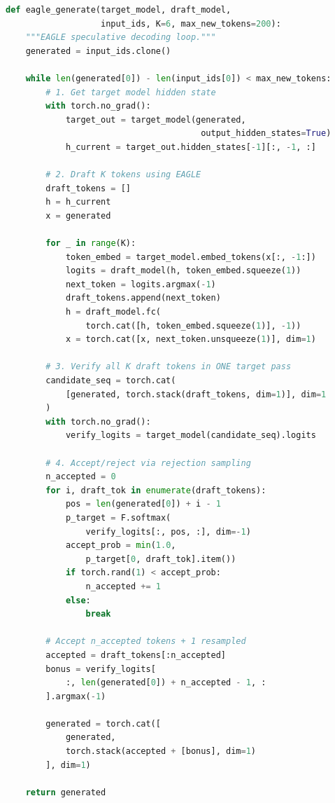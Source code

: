 \documentclass[11pt,a4paper]{article}
\begin{document}
\begin{lstlisting}[language=Python, caption={EAGLE Speculative Decoding Loop}]
def eagle_generate(target_model, draft_model, 
                   input_ids, K=6, max_new_tokens=200):
    """EAGLE speculative decoding loop."""
    generated = input_ids.clone()
    
    while len(generated[0]) - len(input_ids[0]) < max_new_tokens:
        # 1. Get target model hidden state
        with torch.no_grad():
            target_out = target_model(generated, 
                                       output_hidden_states=True)
            h_current = target_out.hidden_states[-1][:, -1, :]
        
        # 2. Draft K tokens using EAGLE
        draft_tokens = []
        h = h_current
        x = generated
        
        for _ in range(K):
            token_embed = target_model.embed_tokens(x[:, -1:])
            logits = draft_model(h, token_embed.squeeze(1))
            next_token = logits.argmax(-1)
            draft_tokens.append(next_token)
            h = draft_model.fc(
                torch.cat([h, token_embed.squeeze(1)], -1))
            x = torch.cat([x, next_token.unsqueeze(1)], dim=1)
        
        # 3. Verify all K draft tokens in ONE target pass
        candidate_seq = torch.cat(
            [generated, torch.stack(draft_tokens, dim=1)], dim=1
        )
        with torch.no_grad():
            verify_logits = target_model(candidate_seq).logits
        
        # 4. Accept/reject via rejection sampling
        n_accepted = 0
        for i, draft_tok in enumerate(draft_tokens):
            pos = len(generated[0]) + i - 1
            p_target = F.softmax(
                verify_logits[:, pos, :], dim=-1)
            accept_prob = min(1.0, 
                p_target[0, draft_tok].item())
            if torch.rand(1) < accept_prob:
                n_accepted += 1
            else:
                break
        
        # Accept n_accepted tokens + 1 resampled
        accepted = draft_tokens[:n_accepted]
        bonus = verify_logits[
            :, len(generated[0]) + n_accepted - 1, :
        ].argmax(-1)
        
        generated = torch.cat([
            generated,
            torch.stack(accepted + [bonus], dim=1)
        ], dim=1)
    
    return generated
\end{lstlisting}
\end{document}
